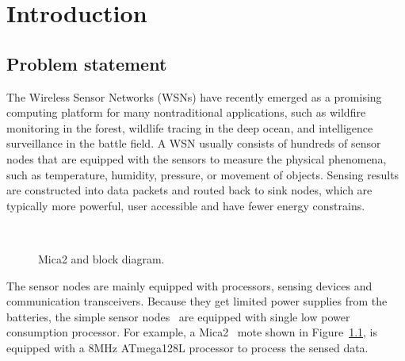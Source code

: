\chapter{Introduction}\label{chap:intro}

\section{Problem statement}

The Wireless Sensor Networks (WSNs) have recently emerged as a promising computing platform for many nontraditional applications, such as wildfire monitoring in the forest, wildlife tracing in the deep ocean, and intelligence surveillance in the battle field. A WSN usually consists of hundreds of sensor nodes that are equipped with the sensors to measure the physical phenomena, such as temperature, humidity, pressure, or movement of objects. Sensing results are constructed into data packets and routed back to sink nodes, which are typically more powerful, user accessible and have fewer energy constrains.

\begin{figure}[h]
\centering
\mbox{\quad
     \quad}
\caption{Mica2 and block diagram.}
\label{fig:mica2}
\end{figure}

The sensor nodes are mainly equipped with processors, sensing devices and communication transceivers. Because they get limited power supplies from the batteries, the simple sensor nodes~\cite{mica2-power, micaz-power,telos,telosb} are equipped with single low power consumption processor. 
For example, a Mica2~\cite{mica2-power} mote shown in Figure~\ref{fig:mica2}, is equipped with a 8MHz ATmega128L processor to process the sensed data.

